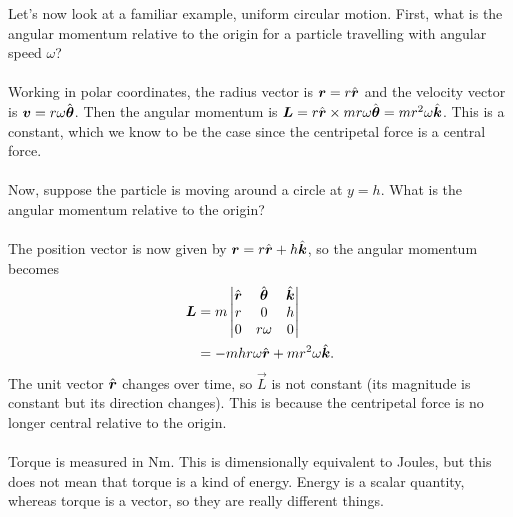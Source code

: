 \documentclass[../classical_mechanics.tex]{subfiles}
\begin{document}
        \begin{example}
            Let's now look at a familiar example, uniform circular motion.
            First, what is the angular momentum relative to the origin for a particle travelling with angular speed $\omega$?

            \paragraph{}
            Working in polar coordinates, the radius vector is $\boldsymbol{r}=r\hat{\boldsymbol{r}}$ and the velocity vector is $\boldsymbol{v}=r\omega\hat{\boldsymbol{\theta}}$.
            Then the angular momentum is $\boldsymbol{L}=r\hat{\boldsymbol{r}}\times mr\omega\hat{\boldsymbol{\theta}}=mr^2\omega\hat{\boldsymbol{k}}$.
            This is a constant, which we know to be the case since the centripetal force is a central force.

            \paragraph{}
            Now, suppose the particle is moving around a circle at $y=h$.
            What is the angular momentum relative to the origin?

            \paragraph{}
            The position vector is now given by $\boldsymbol{r}=r\hat{\boldsymbol{r}}+h\hat{\boldsymbol{k}}$, so the angular momentum becomes
            \begin{align}
                \boldsymbol{L}&=m\begin{vmatrix}
                    \hat{\boldsymbol{r}} & \hat{\boldsymbol{\theta}} & \hat{\boldsymbol{k}} \\
                    r & 0 & h \\
                    0 & r\omega & 0
                \end{vmatrix}\\
                &=-mhr\omega\hat{\boldsymbol{r}}+mr^2\omega\hat{\boldsymbol{k}}.
            \end{align}
            The unit vector $\hat{\boldsymbol{r}}$ changes over time, so $\vec{L}$ is not constant (its magnitude is constant but its direction changes).
            This is because the centripetal force is no longer central relative to the origin.
        \end{example}

        \paragraph{}
        Torque is measured in $\unit{\newton\meter}$.
        This is dimensionally equivalent to Joules, but this does not mean that torque is a kind of energy.
        Energy is a scalar quantity, whereas torque is a vector, so they are really different things.
\end{document}
